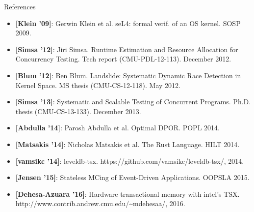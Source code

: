 \documentclass[xcolor=dvipsnames]{beamer}
\begin{document}
\begin{frame}{References}
	\footnotesize
	\begin{itemize}
		\item {\bf [Klein '09]}: Gerwin Klein et al. seL4: formal verif. of an OS kernel. SOSP 2009.
		\item {\bf [Simsa '12]}: Jiri Simsa. Runtime Estimation and Resource Allocation for
			Concurrency Testing. Tech report (CMU-PDL-12-113). December 2012.
		\item {\bf [Blum '12]}: Ben Blum. Landslide: Systematic Dynamic Race Detection in Kernel Space.
			MS thesis (CMU-CS-12-118). May 2012.
		\item {\bf [Simsa '13]}: Systematic and Scalable Testing of Concurrent Programs.
			Ph.D. thesis (CMU-CS-13-133). December 2013.
		\item {\bf [Abdulla '14]}: Parosh Abdulla et al. Optimal DPOR. POPL 2014.
		\item {\bf [Matsakis '14]}: Nicholas Matsakis et al. The Rust Language. HILT 2014.
		\item {\bf [vamsikc '14]}: leveldb-tsx. https://github.com/vamsikc/leveldb-tsx/, 2014.
		\item {\bf [Jensen '15]}: Stateless MCing of Event-Driven Applications. OOPSLA 2015.
		\item {\bf [Dehesa-Azuara '16]}: Hardware transactional memory with intel's TSX.
			http://www.contrib.andrew.cmu.edu/\textasciitilde{}mdehesaa/, 2016.
	\end{itemize}
\end{frame}
\end{document}
